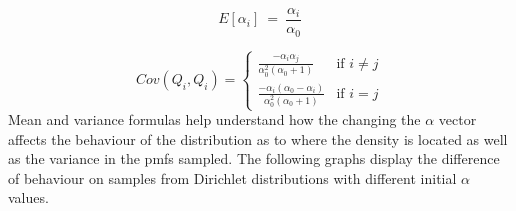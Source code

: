 \documentclass[twoside,hidelinks]{article}
\begin{document}
\begin{equation}
 E[ \alpha_i]\ =\ \frac{ \alpha_i }{ \alpha_0 } 
\end{equation}

\begin{equation}
 Cov(Q_i,Q_i) =
\left\{
	\begin{array}{ll}
		\frac{ - \alpha_i \alpha_j }{ \alpha_0^2 ( \alpha_0+1) }                   & \mbox{if } i \neq j  \\
		\frac{ - \alpha_i ( \alpha_0 - \alpha_i) }{ \alpha_0^2 ( \alpha_0+1)} & \mbox{if } i=j
	\end{array}
\right.
\end{equation}
Mean and variance formulas help understand how the changing the $ \alpha $ vector affects the behaviour of the distribution as to where the density is located as well as the variance in the pmfs sampled. The following graphs display the difference of behaviour on samples from Dirichlet distributions with different initial $\alpha$ values.
\end{document}
